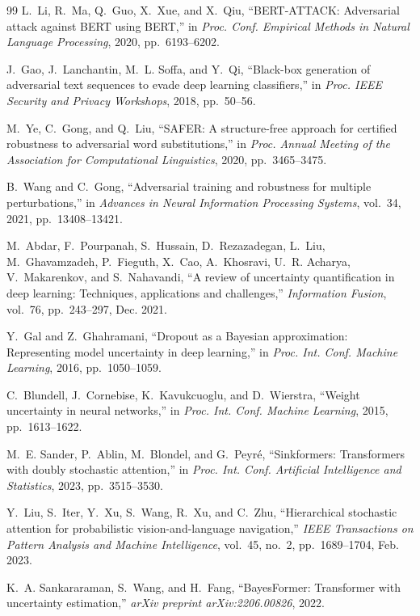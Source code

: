 \documentclass[12pt,a4paper]{article}
\theoremstyle{definition}
\begin{document}
\begin{thebibliography}{99}
L.~Li, R.~Ma, Q.~Guo, X.~Xue, and X.~Qiu, ``BERT-ATTACK: Adversarial attack against BERT using BERT,'' in \emph{Proc. Conf. Empirical Methods in Natural Language Processing}, 2020, pp.~6193--6202.

J.~Gao, J.~Lanchantin, M.~L. Soffa, and Y.~Qi, ``Black-box generation of adversarial text sequences to evade deep learning classifiers,'' in \emph{Proc. IEEE Security and Privacy Workshops}, 2018, pp.~50--56.

M.~Ye, C.~Gong, and Q.~Liu, ``SAFER: A structure-free approach for certified robustness to adversarial word substitutions,'' in \emph{Proc. Annual Meeting of the Association for Computational Linguistics}, 2020, pp.~3465--3475.

B.~Wang and C.~Gong, ``Adversarial training and robustness for multiple perturbations,'' in \emph{Advances in Neural Information Processing Systems}, vol.~34, 2021, pp.~13408--13421.

M.~Abdar, F.~Pourpanah, S.~Hussain, D.~Rezazadegan, L.~Liu, M.~Ghavamzadeh, P.~Fieguth, X.~Cao, A.~Khosravi, U.~R. Acharya, V.~Makarenkov, and S.~Nahavandi, ``A review of uncertainty quantification in deep learning: Techniques, applications and challenges,'' \emph{Information Fusion}, vol.~76, pp.~243--297, Dec. 2021.

Y.~Gal and Z.~Ghahramani, ``Dropout as a Bayesian approximation: Representing model uncertainty in deep learning,'' in \emph{Proc. Int. Conf. Machine Learning}, 2016, pp.~1050--1059.

C.~Blundell, J.~Cornebise, K.~Kavukcuoglu, and D.~Wierstra, ``Weight uncertainty in neural networks,'' in \emph{Proc. Int. Conf. Machine Learning}, 2015, pp.~1613--1622.

M.~E. Sander, P.~Ablin, M.~Blondel, and G.~Peyré, ``Sinkformers: Transformers with doubly stochastic attention,'' in \emph{Proc. Int. Conf. Artificial Intelligence and Statistics}, 2023, pp.~3515--3530.

Y.~Liu, S.~Iter, Y.~Xu, S.~Wang, R.~Xu, and C.~Zhu, ``Hierarchical stochastic attention for probabilistic vision-and-language navigation,'' \emph{IEEE Transactions on Pattern Analysis and Machine Intelligence}, vol.~45, no.~2, pp.~1689--1704, Feb. 2023.

K.~A. Sankararaman, S.~Wang, and H.~Fang, ``BayesFormer: Transformer with uncertainty estimation,'' \emph{arXiv preprint arXiv:2206.00826}, 2022.


\end{thebibliography}
\end{document}
